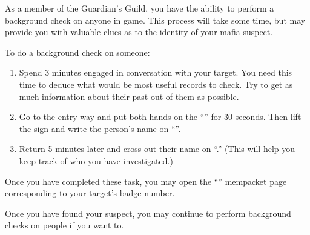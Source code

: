 \documentclass[green]{NeptuneBall}
\begin{document}
\name{\gBackground{}}

As a member of the Guardian's Guild, you have the ability to perform a background check on anyone in game. This process will take some time, but may provide you with valuable clues as to the identity of your mafia suspect.

To do a background check on someone:
\begin{enumerate}
\item Spend 3 minutes engaged in conversation with your target. You need this time to deduce what would be most useful records to check. Try to get as much information about their past out of them as possible.
\item Go to the entry way and put both hands on the ``\sBackgroundCheck{}'' for 30 seconds. Then lift the sign and write the person's name on ``\sBackgroundCheckTwo{}''.
\item Return 5 minutes later and cross out their name on ``\sBackgroundCheckTwo{}.'' (This will help you keep track of who you have investigated.)
\end{enumerate}

Once you have completed these task, you may open the ``\nMafia{\MYname}'' mempacket page corresponding to your target's badge number.

Once you have found your suspect, you may continue to perform background checks on people if you want to.
\end{document}
